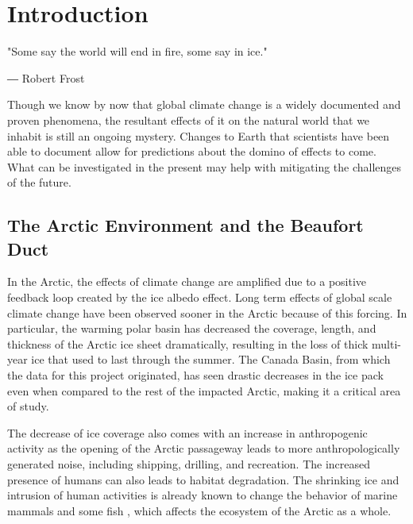 
\chapter{Introduction}  \label{introduction}

\begin{center}
  \begin{minipage}{0.5\textwidth}
    \begin{small}
      "Some say the world will end in fire, some say in ice." 
      
      ― Robert Frost
    \end{small}
  \end{minipage}
  \vspace{0.5cm}
\end{center}

\noindent Though we know by now that global climate change is a widely documented and proven phenomena, the resultant effects of it on the natural world that we inhabit is still an ongoing mystery. Changes to Earth that scientists have been able to document allow for predictions about the domino of effects to come. What can be investigated in the present may help with mitigating the challenges of the future. %

\section{The Arctic Environment and the Beaufort Duct} \label{intro_enviro}

In the Arctic, the effects of climate change are amplified due to a positive feedback loop created by the ice albedo effect. Long term effects of global scale climate change have been observed sooner in the Arctic because of this forcing. In particular, the warming polar basin has decreased the coverage, length, and thickness of the Arctic ice sheet dramatically, resulting in the loss of thick multi-year ice that used to last through the summer. The Canada Basin, from which the data for this project originated, has seen drastic decreases in the ice pack even when compared to the rest of the impacted Arctic, making it a critical area of study. \parencite{mclaughlin2011rapid}

The decrease of ice coverage also comes with an increase in anthropogenic activity as the opening of the Arctic passageway leads to more anthropologically generated noise, including shipping, drilling, and recreation. \parencite{judson2010trends} The increased presence of humans can also leads to habitat degradation. The shrinking ice and intrusion of human activities is already known to change the behavior of marine mammals \parencite{blackwell2015effects} and some fish \parencite{ivanova2020shipping}, which affects the ecosystem of the Arctic as a whole. 

